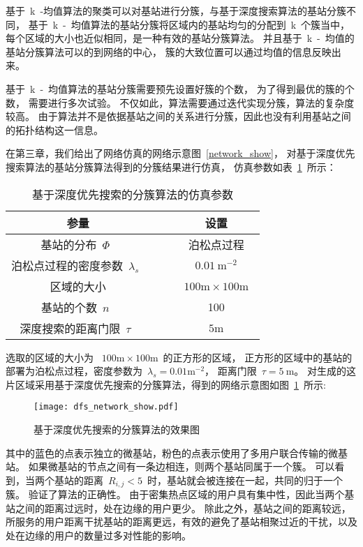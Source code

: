 基于~k~-均值算法的聚类可以对基站进行分簇，与基于深度搜索算法的基站分簇不同，
基于~k~-~均值算法的基站分簇将区域内的基站均匀的分配到~k~个簇当中，
每个区域的大小也近似相同，是一种有效的基站分簇算法。
并且基于~k~-~均值的基站分簇算法可以的到网络的中心，
簇的大致位置可以通过均值的信息反映出来。

基于~k~-~均值算法的基站分簇需要预先设置好簇的个数，
为了得到最优的簇的个数，
需要进行多次试验。
不仅如此，算法需要通过迭代实现分簇，算法的复杂度较高。
由于算法并不是依据基站之间的关系进行分簇，因此也没有利用基站之间的拓扑结构这一信息。



在第三章，我们给出了网络仿真的网络示意图~\ref{network_show}，
对基于深度优先搜索算法的基站分簇算法得到的分簇结果进行仿真，
仿真参数如表~\ref{dfs_show_sim_para}~所示：
\begin{table}[htbp]
\caption{基于深度优先搜索的分簇算法的仿真参数}
\label{dfs_show_sim_para}
\vspace{0.5em}\centering\wuhao
\begin{tabular}{cccc}
\toprule[1.5pt]
参量 & & & 设置 \\
\midrule[0.5pt]
基站的分布~$\Phi$~ & & & 泊松点过程 \\
泊松点过程的密度参数~$\lambda_s$~ & & & ~$0.01~\mathrm{m}^{-2}$~ \\
区域的大小  & & & ~$100\mathrm{m} \times 100 \mathrm{m}$~ \\
基站的个数~$n$~  & & & 100\\
深度搜索的距离门限~$\tau$~ & & & ~$5\mathrm{m}$~\\
\bottomrule[1.5pt]
\end{tabular}
\end{table}

选取的区域的大小为 ~$100\mathrm{m} \times 100 \mathrm{m}$~的正方形的区域，
正方形的区域中的基站的部署为泊松点过程，密度参数为~$\lambda_s=0.01 \mathrm{m}^{-2}$，
距离门限~$\tau=5~\mathrm{m}$。
对生成的这片区域采用基于深度优先搜索的分簇算法，得到的网络示意图如图~\ref{dfs_network_show}~所示:
\begin{figure}[htbp]
\centering
\texttt{[image: dfs\_network\_show.pdf]}
\caption{基于深度优先搜索的分簇算法的效果图}\vspace{-0.5em}
\label{dfs_network_show}
\end{figure}
其中的蓝色的点表示独立的微基站，粉色的点表示使用了多用户联合传输的微基站。
如果微基站的节点之间有一条边相连，则两个基站同属于一个簇。
可以看到，当两个基站的距离~$R_{i,j} < 5$~时，基站就会被连接在一起，共同的归于一个簇。
验证了算法的正确性。
由于密集热点区域的用户具有集中性，因此当两个基站之间的距离过远时，处在边缘的用户更少。
除此之外，基站之间的距离较远，所服务的用户距离干扰基站的距离更远，有效的避免了基站相聚过近的干扰，以及处在边缘的用户的数量过多对性能的影响。

